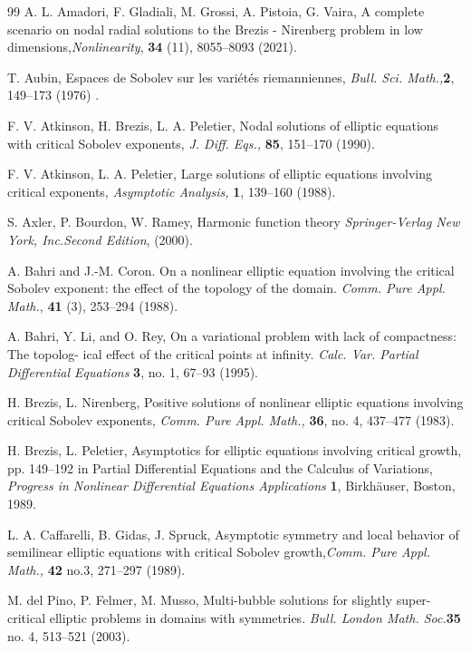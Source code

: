 \documentclass[11pt,a4paper]{amsart}
\theoremstyle{definition}
\renewcommand{\(}{\left(}
\renewcommand{\)}{\right)}
\begin{document}
\begin{thebibliography}{99}
 A. L. Amadori, F. Gladiali, M. Grossi, A. Pistoia, G. Vaira, A complete scenario on
nodal radial solutions to the Brezis - Nirenberg problem in low dimensions,{\it Nonlinearity},
{\bf 34} (11), 8055--8093 (2021).

T. Aubin, Espaces de Sobolev sur les vari\'et\'es riemanniennes, {\it Bull. Sci. Math.,}{\bf 2}, 149--173 (1976) .

F. V. Atkinson, H. Brezis, L. A. Peletier, Nodal solutions of elliptic equations with critical Sobolev exponents, {\it J. Diff. Eqs.,} {\bf 85}, 151--170 (1990).

F. V. Atkinson, L. A. Peletier, Large solutions of elliptic equations involving critical exponents, {\it Asymptotic Analysis,} {\bf 1}, 139--160 (1988).

S. Axler, P. Bourdon, W. Ramey, Harmonic function theory {\it Springer-Verlag New York, Inc.Second Edition}, (2000).

 A. Bahri and J.-M. Coron. On a nonlinear elliptic equation involving the critical Sobolev exponent:
the eﬀect of the topology of the domain. {\it Comm. Pure Appl. Math.}, {\bf 41} (3), 253--294 (1988).

A. Bahri, Y. Li, and O. Rey, On a variational problem with lack of compactness: The topolog-
ical effect of the critical points at infinity. {\it Calc. Var. Partial Differential Equations} {\bf 3},
no. 1, 67--93 (1995).

H. Brezis, L. Nirenberg, Positive solutions of nonlinear elliptic equations involving critical Sobolev exponents, {\it Comm. Pure Appl. Math.,} {\bf 36}, no. 4, 437--477 (1983).


H. Brezis, L. Peletier, Asymptotics for elliptic equations involving critical growth, pp. 149--192 in Partial Differential Equations and the Calculus of Variations, {\em Progress in Nonlinear Differential Equations Applications} {\bf 1}, Birkh\"auser, Boston, 1989.

L. A. Caffarelli, B. Gidas, J. Spruck, Asymptotic symmetry and local behavior of semilinear
elliptic equations with critical Sobolev growth,{\it Comm. Pure Appl. Math.,} {\bf 42}  no.3, 271--297 (1989).

 M. del Pino, P. Felmer, M. Musso,   Multi-bubble solutions for slightly super-critical elliptic problems in domains with symmetries. {\it  Bull. London Math. Soc.}{\bf  35}  no. 4, 513–521 (2003).


\end{thebibliography}
\end{document}
